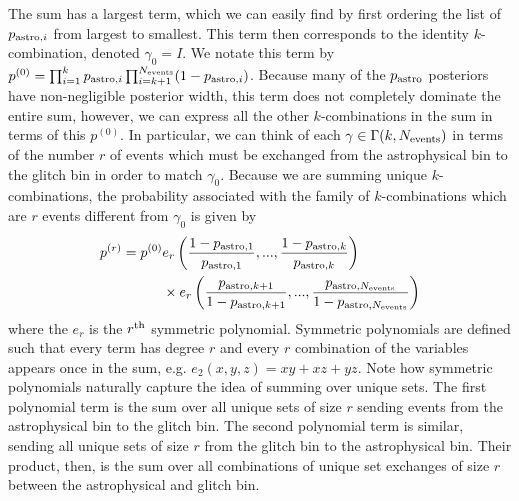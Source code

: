 \begin{refsection}
The sum has a largest term, which we can easily find by first ordering the list of $p_{{\rm astro},i}$ from largest to smallest. This term then corresponds to the identity $k$-combination, denoted $\gamma_0 = I$. We notate this term by $p^{(0)} = \prod_{i=1}^k p_{{\rm astro},i}\prod_{i=k+1}^{N_{\rm events}}(1-p_{{\rm astro},i})$. Because many of the $p_{\rm astro}$ posteriors have non-negligible posterior width, this term does not completely dominate the entire sum, however, we can express all the other $k$-combinations in the sum in terms of this $p^{(0)}$. In particular, we can think of each $\gamma \in \Gamma(k, N_{\rm events})$ in terms of the number $r$ of events which must be exchanged from the astrophysical bin to the glitch bin in order to match $\gamma_0$. Because we are summing unique $k$-combinations, the probability associated with the family of $k$-combinations which are $r$ events different from $\gamma_0$ is given by
\begin{align}
    p^{(r)} = p^{(0)}&e_r\left(\frac{1-p_{{\rm astro},1}}{p_{{\rm astro},1}}, ..., \frac{1-p_{{\rm astro},k}}{p_{{\rm astro},k}}\right) \nonumber \\ &\times e_r\left(\frac{p_{{\rm astro},k+1}}{1-p_{{\rm astro},k+1}}, ..., \frac{p_{{\rm astro},N_{\rm events}}}{1-p_{{\rm astro}, N_{\rm events}}}\right)
\end{align}
where the $e_r$ is the $r^{\rm th}$ symmetric polynomial. Symmetric polynomials are defined such that every term has degree $r$ and every $r$ combination of the variables appears once in the sum, e.g. $e_2(x,y,z) = xy + xz + yz$. Note how symmetric polynomials naturally capture the idea of summing over unique sets. The first polynomial term is the sum over all unique sets of size $r$ sending events from the astrophysical bin to the glitch bin. The second polynomial term is similar, sending all unique sets of size $r$ from the glitch bin to the astrophysical bin. Their product, then, is the sum over all combinations of unique set exchanges of size $r$ between the astrophysical and glitch bin. 


\end{refsection}
